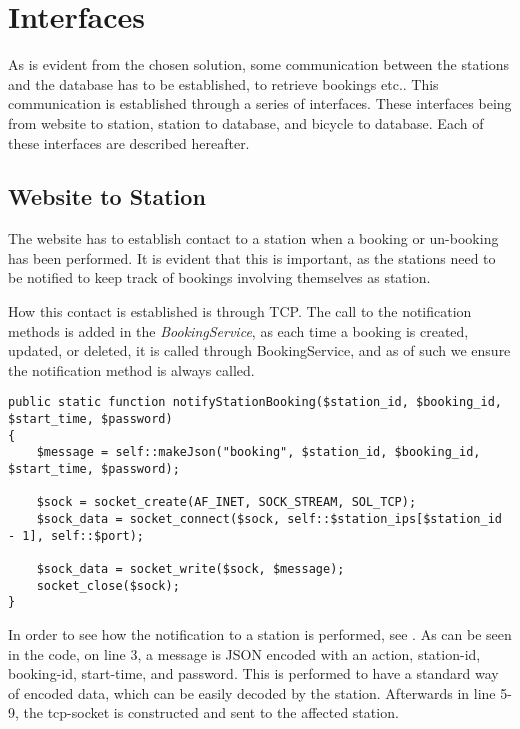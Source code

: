 \section{Interfaces}
As is evident from the chosen solution, some communication between the stations and the database has to be established, to retrieve bookings etc..
This communication is established through a series of interfaces.
These interfaces being from website to station, station to database, and bicycle to database.
Each of these interfaces are described hereafter.

\subsection{Website to Station}\label{sec:webToStationI}
The website has to establish contact to a station when a booking or un-booking has been performed.
It is evident that this is important, as the stations need to be notified to keep track of bookings involving themselves as station.

How this contact is established is through TCP.
The call to the notification methods is added in the \textit{BookingService}, as each time a booking is created, updated, or deleted, it is called through BookingService, and as of such we ensure the notification method is always called.

\begin{minipage}{\textwidth}
\begin{lstlisting}[caption = {Function for notifying a station of a new booking.}, label = {lst:notifystationbooking}]
public static function notifyStationBooking($station_id, $booking_id, $start_time, $password)
{
	$message = self::makeJson("booking", $station_id, $booking_id, $start_time, $password);
	
	$sock = socket_create(AF_INET, SOCK_STREAM, SOL_TCP);
	$sock_data = socket_connect($sock, self::$station_ips[$station_id - 1], self::$port);
	
	$sock_data = socket_write($sock, $message);
	socket_close($sock);
}
\end{lstlisting}
\end{minipage}

In order to see how the notification to a station is performed, see .
As can be seen in the code, on line 3, a message is JSON encoded with an action, station-id, booking-id, start-time, and password.
This is performed to have a standard way of encoded data, which can be easily decoded by the station.
Afterwards in line 5-9, the tcp-socket is constructed and sent to the affected station.

